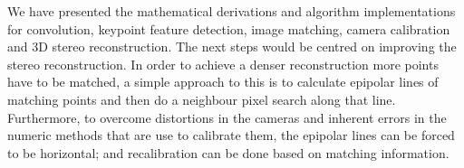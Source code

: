 \documentclass[12pt]{article}
\begin{document}
We have presented the mathematical derivations and algorithm implementations for convolution, keypoint feature detection, image matching, camera calibration and 3D stereo reconstruction.
The next steps would be centred on improving the stereo reconstruction.
In order to achieve a denser reconstruction more points have to be matched, a simple approach to this is to calculate epipolar lines of matching points and then do a neighbour pixel search along that line.
Furthermore, to overcome distortions in the cameras and inherent errors in the numeric methods that are use to calibrate them, the epipolar lines can be forced to be horizontal; and recalibration can be done based on matching information.



\end{document}
